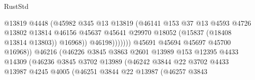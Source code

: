 \begin{lexlean}{RustStd}
\begin{coremodule}
{\begin{coremodule}
{{{{{{{{{{{{{{{{{{{{{{{{{{{{{{{{{{{{{{{{{{{{{{{{{{{{{{{{{{{{                                                @13819
                                                @4448
                                                (@45982
                                                  @345
                                                  @13
                                                  @13819
                                                  (@46141
                                                    @153
                                                    @37
                                                    @13
                                                    @4593
                                                    @4726
                                                    @13802
                                                    @13814
                                                    @46156
                                                    @45637
                                                    @45641
                                                    @29970
                                                    @18052
                                                    (@15837 (@18408 @13814 @13803))
                                                    @16968))
                                                @46198)))))))
                                  @45691
                                  @45694
                                  @45697
                                  @45700
                                  @16968))
                              @46216
                              (@46226
                                @3845
                                @3863
                                @2601
                                @13989
                                @153
                                @12395
                                @4433
                                @14309
                                (@46236
                                  @3845
                                  @3702
                                  @13989
                                  (@46242
                                    @3844
                                    @22
                                    @3702
                                    @4433
                                    @13987
                                    @4245
                                    @4005
                                    (@46251
                                      @3844
                                      @22
                                      @13987
                                      (@46257
                                        @3843
}}}}}}}}}}}}}}}}}}}}}}}}}}}}}}}}}}}}}}}}}}}}}}}}}}}}}}}}}}}}
\end{coremodule}}
\end{coremodule}
\end{lexlean}
